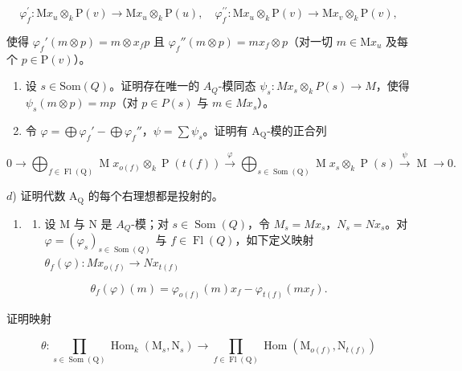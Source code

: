 \[
\varphi_ {f} ^ {\prime} \colon \mathrm{M} x _ {u} \otimes_ {k} \mathrm{P} (v) \to \mathrm{M} x _ {u} \otimes_ {k} \mathrm{P} (u), \quad \varphi_ {f} ^ {\prime \prime} \colon \mathrm{M} x _ {u} \otimes_ {k} \mathrm{P} (v) \to \mathrm{M} x _ {v} \otimes_ {k} \mathrm{P} (v),
\]

 使得 \(\varphi_f'(m \otimes p) = m \otimes x_f p\) 且 \(\varphi_f''(m \otimes p) = mx_f \otimes p\)（对一切 \(m \in \mathrm{M}x_u\) 及每个 \(p \in \mathrm{P}(v)\)）。

\begin{enumerate}
\def\labelenumi{\alph{enumi})}
\setcounter{enumi}{1}
\item
  设 \(s \in \text{Som}(Q)\)。证明存在唯一的 \(A_{Q}\)-模同态 \(\psi_{s}: Mx_{s} \otimes_{k} P(s) \to M\)，使得 \(\psi_{s}(m \otimes p) = mp\)（对 \(p \in P(s)\) 与 \(m \in Mx_{s}\)）。
\item
  令 \(\varphi = \bigoplus \varphi_f' - \bigoplus \varphi_f''\)，\(\psi = \sum \psi_s\)。证明有 \(\mathrm{A}_{\mathrm{Q}}\)-模的正合列
\end{enumerate}

\[
0 \to \bigoplus_ {f \in \operatorname{Fl} (\mathrm{Q})} \operatorname{M} x _ {o (f)} \otimes_ {k} \operatorname{P} (t (f)) \xrightarrow {\varphi} \bigoplus_ {s \in \operatorname{Som} (\mathrm{Q})} \operatorname{M} x _ {s} \otimes_ {k} \operatorname{P} (s) \xrightarrow {\psi} \operatorname{M} \to 0.
\]

\(d\)) 证明代数 \(\mathrm{A_Q}\) 的每个右理想都是投射的。

\begin{enumerate}
\def\labelenumi{\arabic{enumi})}
\setcounter{enumi}{8}
\tightlist
\item
  \begin{enumerate}
  \def\labelenumii{\alph{enumii})}
  \tightlist
  \item
    设 M 与 N 是 \(A_Q\)-模；对 \(s \in \operatorname{Som}(Q)\)，令 \(M_s=Mx_s\)，\(N_s=Nx_s\)。对 \(\varphi = (\varphi_s)_{s \in \operatorname{Som}(Q)}\) 与 \(f \in \operatorname{Fl}(Q)\)，如下定义映射 \(\theta_f(\varphi): Mx_{o(f)} \to Nx_{t(f)}\)
  \end{enumerate}
\end{enumerate}

\[
\theta_ {f} (\varphi) (m) = \varphi_ {o (f)} (m) x _ {f} - \varphi_ {t (f)} (m x _ {f}).
\]

证明映射

\[
\theta \colon \prod_ {s \in \operatorname{Som} (\mathrm{Q})} \operatorname{Hom} _ {k} \left(\mathrm{M} _ {s}, \mathrm{N} _ {s}\right)\rightarrow \prod_ {f \in \operatorname{Fl} (\mathrm{Q})} \operatorname{Hom} \left(\mathrm{M} _ {o (f)}, \mathrm{N} _ {t (f)}\right)
\]

